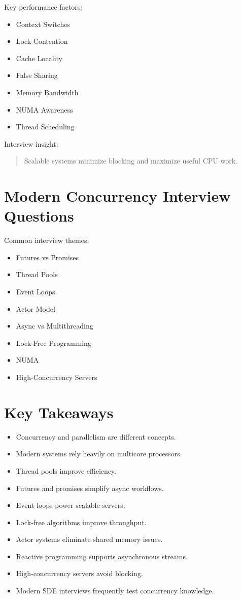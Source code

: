 Key performance factors:

\begin{itemize}
\item Context Switches
\item Lock Contention
\item Cache Locality
\item False Sharing
\item Memory Bandwidth
\item NUMA Awareness
\item Thread Scheduling
\end{itemize}

Interview insight:

\begin{quote}
Scalable systems minimize blocking and maximize useful CPU work.
\end{quote}

\section{Modern Concurrency Interview Questions}

Common interview themes:

\begin{itemize}
\item Futures vs Promises
\item Thread Pools
\item Event Loops
\item Actor Model
\item Async vs Multithreading
\item Lock-Free Programming
\item NUMA
\item High-Concurrency Servers
\end{itemize}

\section{Key Takeaways}

\begin{itemize}
\item Concurrency and parallelism are different concepts.
\item Modern systems rely heavily on multicore processors.
\item Thread pools improve efficiency.
\item Futures and promises simplify async workflows.
\item Event loops power scalable servers.
\item Lock-free algorithms improve throughput.
\item Actor systems eliminate shared memory issues.
\item Reactive programming supports asynchronous streams.
\item High-concurrency servers avoid blocking.
\item Modern SDE interviews frequently test concurrency knowledge.
\end{itemize}

